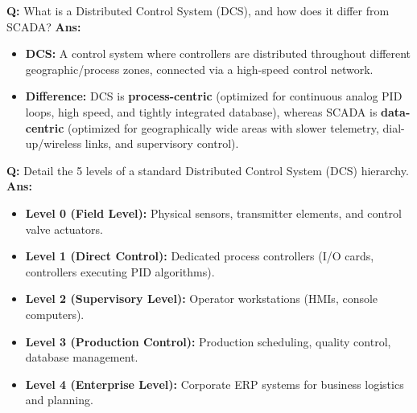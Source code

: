 \documentclass[10pt,a4paper,twocolumn]{article}
\begin{document}
\begin{tcolorbox}[
  colback=white,
  colframe=UnitColorThree,
  colbacktitle=gray!10!white,
  coltitle=black,
  fonttitle=\bfseries\sffamily\small,
  title={Unit III $\bullet$ Card 7: DCS Definition \& DCS vs. SCADA},
  boxrule=1.2pt,
  arc=2mm,
  outer arc=2mm,
  boxsep=1.5mm,
  top=1mm,
  bottom=1mm,
  left=1.5mm,
  right=1.5mm,
  before skip=2.5mm,
  after skip=2.5mm
]
\textbf{Q:} What is a Distributed Control System (DCS), and how does it differ from SCADA?
\tcbline
\textbf{Ans:} \begin{itemize}
  \item   \textbf{DCS:} A control system where controllers are distributed throughout different geographic/process zones, connected via a high-speed control network.
  \item   \textbf{Difference:} DCS is \textbf{process-centric} (optimized for continuous analog PID loops, high speed, and tightly integrated database), whereas SCADA is \textbf{data-centric} (optimized for geographically wide areas with slower telemetry, dial-up/wireless links, and supervisory control).
\end{itemize}
\end{tcolorbox}


\begin{tcolorbox}[
  colback=white,
  colframe=UnitColorThree,
  colbacktitle=gray!10!white,
  coltitle=black,
  fonttitle=\bfseries\sffamily\small,
  title={Unit III $\bullet$ Card 8: DCS Hierarchical Levels},
  boxrule=1.2pt,
  arc=2mm,
  outer arc=2mm,
  boxsep=1.5mm,
  top=1mm,
  bottom=1mm,
  left=1.5mm,
  right=1.5mm,
  before skip=2.5mm,
  after skip=2.5mm
]
\textbf{Q:} Detail the 5 levels of a standard Distributed Control System (DCS) hierarchy.
\tcbline
\textbf{Ans:} \begin{itemize}
  \item   \textbf{Level 0 (Field Level):} Physical sensors, transmitter elements, and control valve actuators.
  \item   \textbf{Level 1 (Direct Control):} Dedicated process controllers (I/O cards, controllers executing PID algorithms).
  \item   \textbf{Level 2 (Supervisory Level):} Operator workstations (HMIs, console computers).
  \item   \textbf{Level 3 (Production Control):} Production scheduling, quality control, database management.
  \item   \textbf{Level 4 (Enterprise Level):} Corporate ERP systems for business logistics and planning.
\end{itemize}
\end{tcolorbox}
\end{document}
